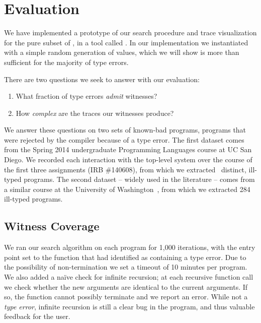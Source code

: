 \section{Evaluation}
\label{sec:evaluation}

%
%
We have implemented a prototype of our search procedure and trace
visualization for the pure subset of \ocaml, in a tool called \nanomaly.
%
In our implementation we instantiated \gensym with a simple random
generation of values, which we will show is more than sufficient for the
majority of type errors.

There are two questions we seek to answer with our evaluation:
\begin{enumerate}
\item What fraction of type errors \emph{admit} witnesses?
\item How \emph{complex} are the traces our witnesses produce?
\end{enumerate}

We answer these questions on two sets of known-bad programs, \ie
programs that were rejected by the \ocaml compiler because of a type
error.
%
The first dataset comes from the Spring 2014 undergraduate Programming
Languages course at UC San Diego.
%
We recorded each interaction with the \ocaml top-level system over the
course of the first three assignments (IRB \#140608), from which we
extracted \ucsdsize\ distinct, ill-typed \ocaml programs.
%
The second dataset -- widely used in the literature -- comes from a
similar course at the University of
Washington~\cite{lerner_seminal:_2006}, from which we extracted 284
ill-typed programs.

\subsection{Witness Coverage}
\label{sec:eval:witness-coverage}
%
We ran our search algorithm on each program for 1,000 iterations, with
the entry point set to the function that \ocaml had identified as
containing a type error.
%
Due to the possibility of non-termination we set a timeout of 10 minutes
per program.
%
We also added a na\"ive check for infinite recursion; at each recursive
function call we check whether the new arguments are identical to the
current arguments.
%
If so, the function cannot possibly terminate and we report an error.
%
While not a \emph{type error}, infinite recursion is still a clear bug
in the program, and thus valuable feedback for the user.

